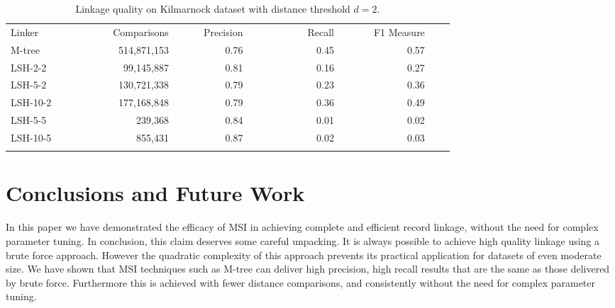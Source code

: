 \documentclass{llncs}
\begin{document}
\begin{table}[t]
\caption{Linkage quality on Kilmarnock dataset with distance
threshold $d= 2$.}
\label{comparison-of-results-demography-kili}
\centering
\begin{footnotesize}
\begin{tabular}{lrrrrrr} \hline\noalign{\smallskip}
  Linker~~~~~~~~~~ & ~~~Comparisons & ~~~~~Precision & 
  ~~~~~~~~~~~Recall & ~~~~~~F1 Measure \\
\noalign{\smallskip} \hline \noalign{\smallskip}
M-tree     & 514,871,153                   & 0.76      & 0.45   & 0.57      \\
\noalign{\smallskip} \hline \noalign{\smallskip}
LSH-2-2   & 99,145,887                    & 0.81      & 0.16   & 0.27       \\
LSH-5-2   & 130,721,338                   & 0.79      & 0.23   & 0.36       \\
LSH-10-2  & 177,168,848                   & 0.79      & 0.36   & 0.49       \\
LSH-5-5   & 239,368                      & 0.84      & 0.01   & 0.02       \\
LSH-10-5  & 855,431                      & 0.87      & 0.02   & 0.03 \\ 
\noalign{\smallskip} \hline
\end{tabular}
\end{footnotesize}
\end{table}


\section{Conclusions and Future Work\label{sec-concl}}

In this paper we have demonstrated the efficacy of MSI in achieving
complete and efficient record linkage, without the need for complex
parameter tuning. In conclusion, this claim deserves some careful
unpacking. It is always possible to achieve high quality linkage using a
brute force approach. However the quadratic complexity of this approach
prevents its practical application for datasets of even moderate size.
We have shown that MSI techniques such as M-tree can deliver high
precision, high recall results that are the same as those delivered by
brute force. Furthermore this is achieved with fewer distance
comparisons, and consistently without the need for complex parameter
tuning.
\end{document}
